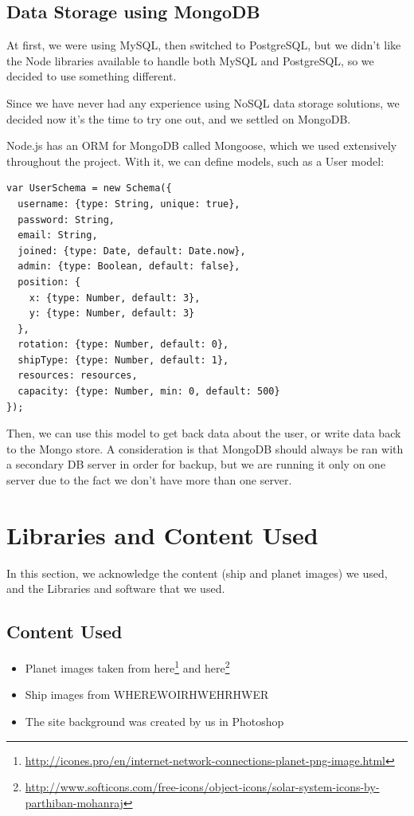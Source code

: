 \documentclass[a4paper,11pt]{article}
\begin{document}
		\subsection{Data Storage using MongoDB}
			At first, we were using MySQL, then switched to PostgreSQL, but we didn't like the Node libraries available to handle both MySQL and PostgreSQL, so we decided to use something different.
			 
			Since we have never had any experience using NoSQL data storage solutions, we decided now it's the time to try one out, and we settled on MongoDB.
			
			Node.js has an ORM for MongoDB called Mongoose, which we used extensively throughout the project. With it, we can define models, such as a User model:
			
			\begin{verbatim}
var UserSchema = new Schema({
  username: {type: String, unique: true},
  password: String,
  email: String,
  joined: {type: Date, default: Date.now},
  admin: {type: Boolean, default: false},
  position: {
    x: {type: Number, default: 3},
    y: {type: Number, default: 3}
  },
  rotation: {type: Number, default: 0},
  shipType: {type: Number, default: 1},
  resources: resources,
  capacity: {type: Number, min: 0, default: 500}
});
			\end{verbatim}
		
			Then, we can use this model to get back data about the user, or write data back to the Mongo store.
			A consideration is that MongoDB should always be ran with a secondary DB server in order for backup, but we are running it only on one server due to the fact we don't have more than one server.
			
	
	\section{Libraries and Content Used}
		In this section, we acknowledge the content (ship and planet images) we used, and the Libraries and software that we used.
		
		\subsection{Content Used}
			\begin{itemize}
				\item Planet images taken from here\footnote{\url{http://icones.pro/en/internet-network-connections-planet-png-image.html}} and here\footnote{\url{http://www.softicons.com/free-icons/object-icons/solar-system-icons-by-parthiban-mohanraj}}
				\item Ship images from WHEREWOIRHWEHRHWER
				\item The site background was created by us in Photoshop
			\end{itemize}
			
\end{document}

